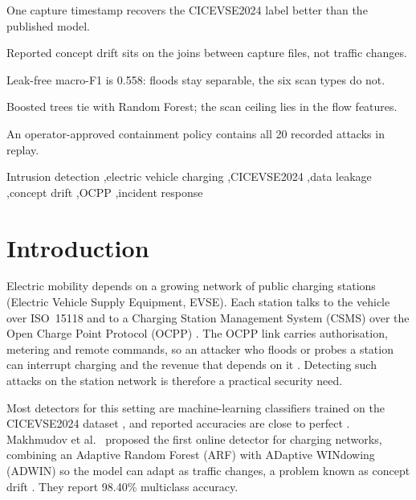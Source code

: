 \documentclass[preprint,12pt]{elsarticle}
\begin{document}
\begin{frontmatter}
\begin{highlights}
\item One capture timestamp recovers the CICEVSE2024 label better than the published model.
\item Reported concept drift sits on the joins between capture files, not traffic changes.
\item Leak-free macro-F1 is 0.558: floods stay separable, the six scan types do not.
\item Boosted trees tie with Random Forest; the scan ceiling lies in the flow features.
\item An operator-approved containment policy contains all 20 recorded attacks in replay.
\end{highlights}

\begin{keyword}
Intrusion detection \sep electric vehicle charging \sep CICEVSE2024 \sep data leakage \sep concept drift \sep OCPP \sep incident response
\end{keyword}

\end{frontmatter}

\linenumbers

\section{Introduction}

Electric mobility depends on a growing network of public charging stations (Electric Vehicle Supply Equipment, EVSE). Each station talks to the vehicle over ISO~15118 and to a Charging Station Management System (CSMS) over the Open Charge Point Protocol (OCPP) \cite{b14}. The OCPP link carries authorisation, metering and remote commands, so an attacker who floods or probes a station can interrupt charging and the revenue that depends on it \cite{b1,b3}. Detecting such attacks on the station network is therefore a practical security need.

Most detectors for this setting are machine-learning classifiers trained on the CICEVSE2024 dataset \cite{b8}, and reported accuracies are close to perfect \cite{b1,b2}. Makhmudov et al.\ \cite{b4} proposed the first online detector for charging networks, combining an Adaptive Random Forest (ARF) \cite{b6} with ADaptive WINdowing (ADWIN) \cite{b7} so the model can adapt as traffic changes, a problem known as concept drift \cite{b15}. They report 98.40\% multiclass accuracy.
\end{document}
